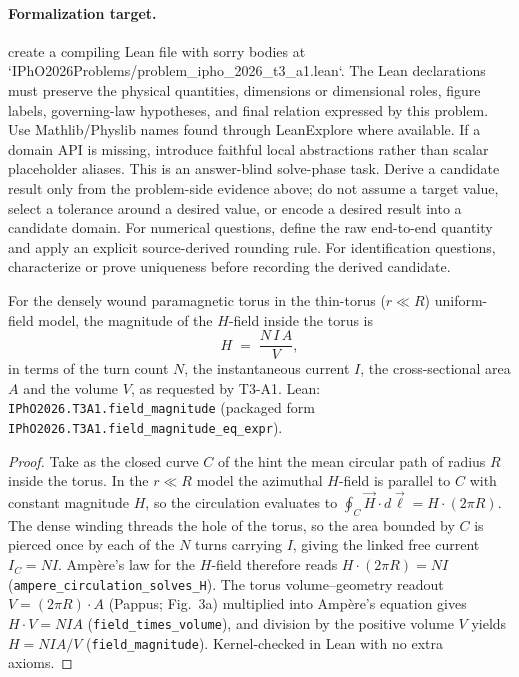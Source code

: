 \paragraph{Formalization target.}
create a compiling Lean file with sorry bodies at `IPhO2026Problems/problem\_ipho\_2026\_t3\_a1.lean`.
The Lean declarations must preserve the physical quantities, dimensions or dimensional roles, figure labels, governing-law hypotheses, and final relation expressed by this problem.
Use Mathlib/Physlib names found through LeanExplore where available. If a domain API is missing, introduce faithful local abstractions rather than scalar placeholder aliases.
This is an answer-blind solve-phase task. Derive a candidate result only from the problem-side evidence above; do not assume a target value, select a tolerance around a desired value, or encode a desired result into a candidate domain.
For numerical questions, define the raw end-to-end quantity and apply an explicit source-derived rounding rule. For identification questions, characterize or prove uniqueness before recording the derived candidate.

\begin{theorem}
\label{thm:physics:ipho_2026_t3_a1:target}
\leanok
For the densely wound paramagnetic torus in the thin-torus ($r \ll R$)
uniform-field model, the magnitude of the $H$-field inside the torus is
\[
  H \;=\; \frac{N\,I\,A}{V},
\]
in terms of the turn count $N$, the instantaneous current $I$, the
cross-sectional area $A$ and the volume $V$, as requested by T3-A1.  Lean:
\texttt{IPhO2026.T3A1.field\_magnitude} (packaged form
\texttt{IPhO2026.T3A1.field\_magnitude\_eq\_expr}).
\end{theorem}
\begin{proof}
\leanok
Take as the closed curve $C$ of the hint the mean circular path of radius $R$
inside the torus.  In the $r \ll R$ model the azimuthal $H$-field is parallel
to $C$ with constant magnitude $H$, so the circulation evaluates to
$\oint_C \vec H \cdot d\vec\ell = H \cdot (2\pi R)$.  The dense winding threads
the hole of the torus, so the area bounded by $C$ is pierced once by each of
the $N$ turns carrying $I$, giving the linked free current $I_C = N I$.
Ampère's law for the $H$-field therefore reads $H \cdot (2\pi R) = N I$
(\texttt{ampere\_circulation\_solves\_H}).  The torus volume--geometry readout
$V = (2\pi R) \cdot A$ (Pappus; Fig.~3a) multiplied into Ampère's equation
gives $H \cdot V = N I A$ (\texttt{field\_times\_volume}), and division by the
positive volume $V$ yields $H = N I A / V$
(\texttt{field\_magnitude}).  Kernel-checked in Lean with no extra axioms.
\end{proof}
